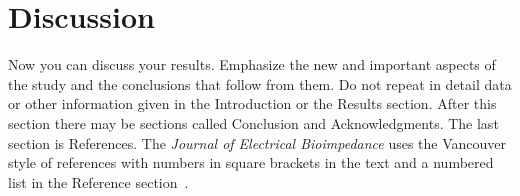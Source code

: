 \documentclass{elbioimp}
\begin{document}
\section{Discussion}
Now you can discuss your results. Emphasize the new and important
aspects of the study and the conclusions that follow from them. Do not
repeat in detail data or other information given in the Introduction
or the Results section. After this section there may be sections
called Conclusion and Acknowledgments. The last section is
References. The \emph{Journal of Electrical Bioimpedance} uses the
Vancouver style of references with numbers in square brackets in the
text and a numbered list in the Reference section~\cite{NIH}.

\nocite{Halpern,Meltzer,Murray,Rose}

\end{document}
